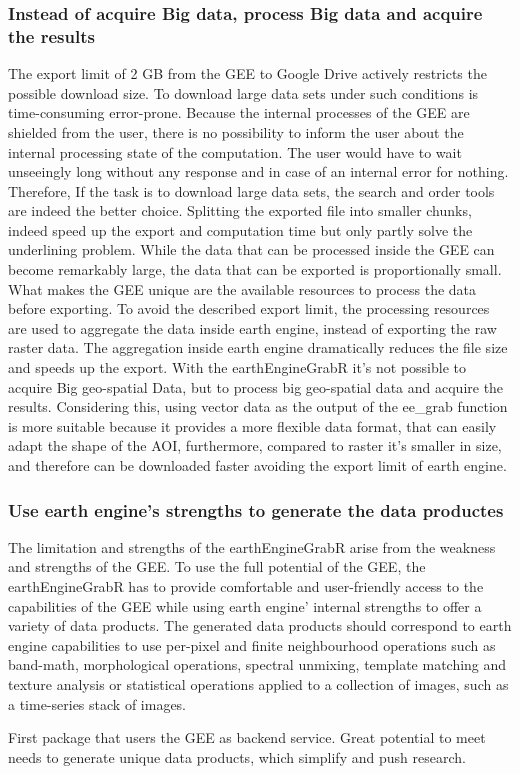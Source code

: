 \subsubsection{Instead of acquire Big data, process Big data and acquire the results}

The export limit of 2 GB from the GEE to Google Drive actively restricts the possible download size. To download large data sets under such conditions is time-consuming error-prone. Because the internal processes of the GEE are shielded from the user, there is no possibility to inform the user about the internal processing state of the computation. The user would have to wait unseeingly long without any response and in case of an internal error for nothing.
Therefore, If the task is to download large data sets, the search and order tools are indeed the better choice.
Splitting the exported file into smaller chunks, indeed speed up the export and computation time but only partly solve the underlining problem.
While the data that can be processed inside the GEE can become remarkably large, the data that can be exported is proportionally small.
What makes the GEE unique are the available resources to process the data before exporting. 
To avoid the described export limit, the processing resources are used to aggregate the data inside earth engine, instead of exporting the raw raster data. The aggregation inside earth engine dramatically reduces the file size and speeds up the export. 
With the earthEngineGrabR it's not possible to acquire Big geo-spatial Data, but to process big geo-spatial data and acquire the results.
Considering this, using vector data as the output of the ee\_grab function is more suitable because it provides a more flexible data format, that can easily adapt the shape of the AOI, furthermore, compared to raster it's smaller in size, and therefore can be downloaded faster avoiding the export limit of earth engine. 

\subsubsection{Use earth engine's strengths to generate the data productes}

The limitation and strengths of the earthEngineGrabR arise from the weakness and strengths of the GEE.
To use the full potential of the GEE, the earthEngineGrabR has to provide comfortable and user-friendly access to the capabilities of the GEE while using earth engine' internal strengths to offer a variety of data products.
The generated data products should correspond to earth engine capabilities to use per-pixel and finite neighbourhood operations such as band-math, morphological operations, spectral unmixing, template matching and texture analysis or statistical operations applied to a collection of images, such as a time-series stack of images. 










First package that users the GEE as backend service.
Great potential to meet needs to generate unique data products, which simplify and push research.






